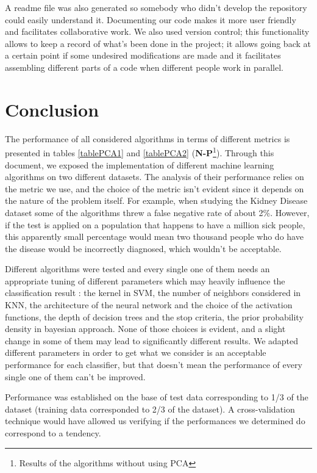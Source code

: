 \documentclass[11pt,a4paper]{article}
\begin{document}
A readme file was also generated so somebody who didn't develop the repository could easily understand it. Documenting our code makes it more user friendly and facilitates collaborative work. We also used version control; this functionality allows to keep a record of what's been done in the project; it allows going back at a certain point if some undesired modifications are made and it facilitates assembling different parts of a code when different people work in parallel. 

\section*{Conclusion}
The performance of all considered algorithms in terms of different metrics is presented in tables \ref{tablePCA1} and \ref{tablePCA2} (\textbf{N-P}\footnote{Results of the algorithms without using PCA}).
Through this document, we exposed the implementation of different machine learning algorithms on two different datasets. The analysis of their performance relies on the metric we use, and the choice of the metric isn't evident since it depends on the nature of the problem itself. For example, when studying the Kidney Disease dataset some of the algorithms threw a false negative rate of about 2\%. However, if the test is applied on a population that happens to have a million sick people, this apparently small percentage would mean two thousand people who do have the disease would be incorrectly diagnosed, which wouldn't be acceptable. 

Different algorithms were tested and every single one of them needs an appropriate tuning of different parameters which may heavily influence the classification result : the kernel in SVM, the number of neighbors considered in KNN, the architecture of the neural network and the choice of the activation functions, the depth of decision trees and the stop criteria, the prior probability density in bayesian approach. None of those choices is evident, and a slight change in some of them may lead to significantly different results. We adapted different parameters in order to get what we consider is an acceptable performance for each classifier, but that doesn't mean the performance of every single one of them can't be improved. 

Performance was established on the base of test data corresponding to 1/3 of the dataset (training data corresponded to 2/3 of the dataset). A cross-validation technique would have allowed us verifying if the performances we determined do correspond to a tendency. 
\end{document}
